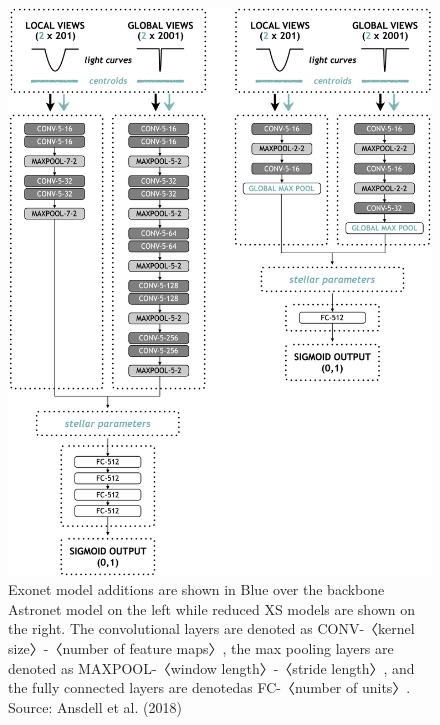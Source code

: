 \begin{figure}[H]
    \centering
    \includegraphics[scale=0.5]{Images/Ansdell.jpg}
    \caption{Exonet model additions are shown in Blue over the backbone Astronet model on the left while reduced XS models are shown on the right. The convolutional layers are denoted as CONV-〈kernel size〉-〈number of feature maps〉, the max pooling layers are denoted as MAXPOOL-〈window length〉-〈stride length〉, and the fully connected layers are denotedas FC-〈number of units〉. Source: Ansdell et al. (2018)}
    \label{fig:Ansdell}
\end{figure}